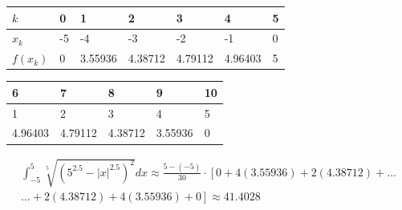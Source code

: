 \documentclass{article}
\begin{document}
\begin{center}
  \begin{tabularx}{\textwidth}{|X|X|X|X|X|X|X|}
    \hline
    $ k $      & 0  & 1       & 2       & 3       & 4       & 5 \\
    \hline
    $ x_k $    & -5 & -4      & -3      & -2      & -1      & 0 \\
    \hline
    $ f(x_k) $ & 0  & 3.55936 & 4.38712 & 4.79112 & 4.96403 & 5 \\
    \hline
  \end{tabularx}
  \newline
  \newline
  \begin{tabularx}{\textwidth}{|X|X|X|X|X|}
    \hline
    6       & 7       & 8       & 9       & 10 \\
    \hline
    1       & 2       & 3       & 4       & 5  \\
    \hline
    4.96403 & 4.79112 & 4.38712 & 3.55936 & 0  \\
    \hline
  \end{tabularx}
\end{center}

\begin{align*}
  \int_{-5}^{5} \sqrt[5]{(5^{2.5}-|x|^{2.5})^2} dx \approx \frac{5-(-5)}{30}\cdot\left[0+4(3.55936) + 2(4.38712)+\dots \right. \\\left.\dots + 2(4.38712) + 4(3.55936) + 0\right] \approx 41.4028
\end{align*}

\begin{center}
\end{center}
\end{document}
